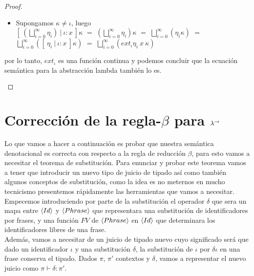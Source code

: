 \begin{proof}
\begin{itemize}
\begin{itemize}
\begin{itemize}
\item Supongamos $\kappa \neq \iota$, luego \\

$[ \ (\bigsqcup\limits^{\infty}_{i=0} \eta_i) \ | \ \iota:x \ ] \kappa$ $=$
$(\bigsqcup\limits^{\infty}_{i=0} \eta_i) \kappa$ $=$
$\bigsqcup\limits^{\infty}_{i=0} (\eta_i \kappa)$ $=$
$\bigsqcup\limits^{\infty}_{i=0} ([ \ \eta_i \ | \ \iota:x \ ] \kappa)$ $=$
$\bigsqcup\limits^{\infty}_{i=0} (ext_\iota \eta_i \ x \ \kappa)$\\
\end{itemize}

por lo tanto, $ext_\iota$ es una funci\'on continua y podemos concluir que
la ecuaci\'on sem\'antica para la abstracci\'on lambda tambi\'en lo es.
\end{itemize}
\end{itemize}
\end{proof}

\section{Correcci\'on de la regla-$\beta$ para $\lambda^{\rightarrow}$}

Lo que vamos a hacer a continuaci\'on es probar que nuestra sem\'antica 
denotacional es correcta con respecto a la regla de reducci\'on $\beta$, para esto
vamos a necesitar el teorema de substituci\'on. Para enunciar y probar este teorema
vamos a tener que introducir un nuevo tipo de juicio de tipado as\'i como tambi\'en
algunos conceptos de substituci\'on, como la idea es no meternos en mucho tecnicismo
presentemos r\'apidamente las herramientas que vamos a necesitar.\\

Empecemos introduciendo por parte de la substituci\'on el operador $\delta$ que 
sera un mapa entre $\langle Id \rangle$ y $\langle Phrase \rangle$ que representara una
substituci\'on de identificadores por frases, y una funci\'on
$FV$ de $\langle Phrase \rangle$ en $\langle Id \rangle$ que determinara los
identificadores libres de una frase.\\

Adem\'as, vamos a necesitar de un juicio de tipado nuevo cuyo significado
ser\'a que dado un identificador $\iota$ y una substituci\'on $\delta$, 
la substituci\'on de $\iota$ por $\delta\iota$ en una frase conserva el 
tipado. Dados $\pi$, $\pi'$ contextos y $\delta$, vamos a representar el 
nuevo juicio como $\pi \vdash \delta : \pi'$.

